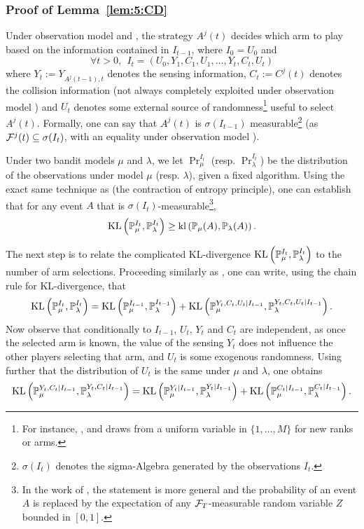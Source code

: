 
\subsubsection{Proof of Lemma~\ref{lem:5:CD}}

Under observation model \modelun{} and \modeldeux, the strategy $A^j(t)$ decides which arm to play based on the information contained in $I_{t-1}$, where $I_0 = U_0$ and
\[\forall t > 0, \ \ I_t = (U_0,Y_1,C_1,U_1,\dots,Y_t,C_t,U_t)\]
where $Y_{t} := Y_{A^j(t-1),t}$ denotes the sensing information, $C_t := C^j(t)$ denotes the collision information (not always completely exploited under observation model \modeldeux) and $U_t$ denotes some external source of randomness\footnote{For instance, \MCTopM, \RandTopM{} and \rhoRand{} draws from a uniform variable in $\{1,\dots,M\}$ for new ranks or arms.} useful to select $A^j(t)$.
Formally, one can say that $A^j(t)$ is $\sigma(I_{t-1})$ measurable\footnote{$\sigma(I_t)$ denotes the sigma-Algebra generated by the observations $I_t$.} (as $\mathcal{F}^j(t) \subseteq \sigma(I_{t})$, with an equality under observation model \modelun).

Under two bandit models $\mu$ and $\lambda$, we let $\Pr_{\mu}^{I_t}$ (resp. $\Pr_{\lambda}^{I_t}$) be the distribution of the observations under model $\mu$ (resp. $\lambda$), given a fixed algorithm.
Using the exact same technique as \cite{Garivier16TrueShape} (the contraction of entropy principle), one can establish that for any event $A$ that is $\sigma(I_t)$-measurable\footnote{In the work of \cite{Garivier16TrueShape}, the statement is more general and the probability of an event $A$ is replaced by the expectation of any $\mathcal{F}_T$-measurable random variable $Z$ bounded in $[0,1]$.},
\[\mathrm{KL}\left(\mathbb{P}_{\mu}^{I_t},\mathbb{P}_{\lambda}^{I_t}\right) \geq \mathrm{kl}\left(\mathbb{P}_{\mu}(A),\mathbb{P}_{\lambda}(A)\right).\]

The next step is to relate the complicated KL-divergence $\mathrm{KL}\left(\mathbb{P}_{\mu}^{I_t},\mathbb{P}_{\lambda}^{I_t}\right)$ to the number of arm selections.
Proceeding similarly as \cite{Garivier16TrueShape}, one can write, using the chain rule for KL-divergence, that
\begin{equation}\label{eq:5:Iterative}\mathrm{KL}\left(\mathbb{P}_{\mu}^{I_{t}},\mathbb{P}_{\lambda}^{I_{t}}\right) =  \mathrm{KL}\left(\mathbb{P}_{\mu}^{I_{t-1}},\mathbb{P}_{\lambda}^{I_{t-1}}\right) + \mathrm{KL}\left(\mathbb{P}_{\mu}^{Y_{t},C_t,U_t | I_{t-1}},\mathbb{P}_{\lambda}^{Y_{t},C_t,U_t | I_{t-1}}\right).\end{equation}
Now observe that conditionally to $I_{t-1}$, $U_t$, $Y_t$ and $C_t$ are independent, as once the selected arm is known, the value of the sensing $Y_t$ does not influence the other players selecting that arm, and $U_t$ is some exogenous randomness.
Using further that the distribution of $U_t$ is the same under $\mu$ and $\lambda$, one obtains
\begin{equation}\mathrm{KL}\left(\mathbb{P}_{\mu}^{Y_{t},C_t | I_{t-1}},\mathbb{P}_{\lambda}^{Y_{t},C_t | I_{t-1}}\right) =
 \mathrm{KL}\left(\mathbb{P}_{\mu}^{Y_{t}| I_{t-1}},\mathbb{P}_{\lambda}^{Y_{t}| I_{t-1}}\right) + \mathrm{KL}\left(\mathbb{P}_{\mu}^{C_t | I_{t-1}},\mathbb{P}_{\lambda}^{C_t | I_{t-1}}\right).\label{eq:5:DecKL}
\end{equation}

